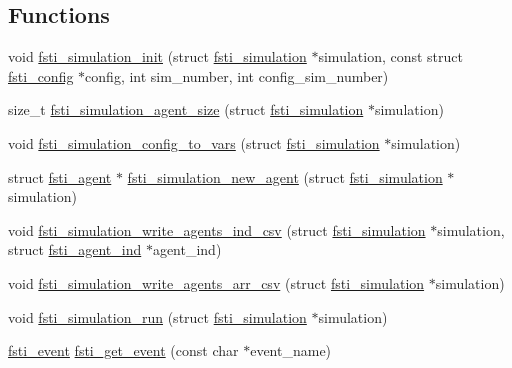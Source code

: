 \subsection*{Functions}
\begin{DoxyCompactItemize}
\item 
void \mbox{\hyperlink{fsti-simulation_8h_a5e7080c9230e123dc212cc19bb209487}{fsti\+\_\+simulation\+\_\+init}} (struct \mbox{\hyperlink{structfsti__simulation}{fsti\+\_\+simulation}} $\ast$simulation, const struct \mbox{\hyperlink{structfsti__config}{fsti\+\_\+config}} $\ast$config, int sim\+\_\+number, int config\+\_\+sim\+\_\+number)
\item 
size\+\_\+t \mbox{\hyperlink{fsti-simulation_8h_a293d3e3e15958886f1e180a285e749cb}{fsti\+\_\+simulation\+\_\+agent\+\_\+size}} (struct \mbox{\hyperlink{structfsti__simulation}{fsti\+\_\+simulation}} $\ast$simulation)
\item 
void \mbox{\hyperlink{fsti-simulation_8h_a8fd28c7a573e98f3785b5f3b7b6b08e7}{fsti\+\_\+simulation\+\_\+config\+\_\+to\+\_\+vars}} (struct \mbox{\hyperlink{structfsti__simulation}{fsti\+\_\+simulation}} $\ast$simulation)
\item 
struct \mbox{\hyperlink{structfsti__agent}{fsti\+\_\+agent}} $\ast$ \mbox{\hyperlink{fsti-simulation_8h_ae23ac2ea7e48646d502421fc0c32962a}{fsti\+\_\+simulation\+\_\+new\+\_\+agent}} (struct \mbox{\hyperlink{structfsti__simulation}{fsti\+\_\+simulation}} $\ast$simulation)
\item 
void \mbox{\hyperlink{fsti-simulation_8h_adac2d348ab392af024a2cbeabfb0c739}{fsti\+\_\+simulation\+\_\+write\+\_\+agents\+\_\+ind\+\_\+csv}} (struct \mbox{\hyperlink{structfsti__simulation}{fsti\+\_\+simulation}} $\ast$simulation, struct \mbox{\hyperlink{structfsti__agent__ind}{fsti\+\_\+agent\+\_\+ind}} $\ast$agent\+\_\+ind)
\item 
void \mbox{\hyperlink{fsti-simulation_8h_acf97be6cf8883189d51292eceea0c43e}{fsti\+\_\+simulation\+\_\+write\+\_\+agents\+\_\+arr\+\_\+csv}} (struct \mbox{\hyperlink{structfsti__simulation}{fsti\+\_\+simulation}} $\ast$simulation)
\item 
void \mbox{\hyperlink{fsti-simulation_8h_ab512e1f50ac5ac9bdde81f48d73137b6}{fsti\+\_\+simulation\+\_\+run}} (struct \mbox{\hyperlink{structfsti__simulation}{fsti\+\_\+simulation}} $\ast$simulation)
\item 
\mbox{\hyperlink{fsti-eventdefs_8h_abce6b23e84620b4f4433c952fa10f0b9}{fsti\+\_\+event}} \mbox{\hyperlink{fsti-simulation_8h_a8f4c7d0a06b617bd410f0d213aba1dc6}{fsti\+\_\+get\+\_\+event}} (const char $\ast$event\+\_\+name)

\end{DoxyCompactItemize}
